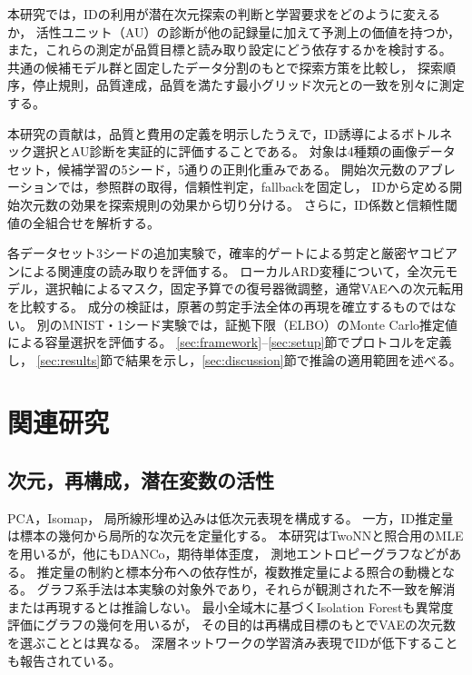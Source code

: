 \documentclass[11pt,a4paper]{ltjsarticle}
\begin{document}
本研究では，IDの利用が潜在次元探索の判断と学習要求をどのように変えるか，
活性ユニット（AU）の診断が他の記録量に加えて予測上の価値を持つか，
また，これらの測定が品質目標と読み取り設定にどう依存するかを検討する。
共通の候補モデル群と固定したデータ分割のもとで探索方策を比較し，
探索順序，停止規則，品質達成，品質を満たす最小グリッド次元との一致を別々に測定する。

本研究の貢献は，品質と費用の定義を明示したうえで，ID誘導によるボトルネック選択とAU診断を実証的に評価することである。
対象は4種類の画像データセット，候補学習の5シード，5通りの正則化重みである。
開始次元数のアブレーションでは，参照群の取得，信頼性判定，fallbackを固定し，
IDから定める開始次元数の効果を探索規則の効果から切り分ける。
さらに，ID係数と信頼性閾値の全組合せを解析する。

各データセット3シードの追加実験で，確率的ゲートによる剪定と厳密ヤコビアンによる関連度の読み取りを評価する。
ローカルARD変種について，全次元モデル，選択軸によるマスク，固定予算での復号器微調整，通常VAEへの次元転用を比較する。
成分の検証は，原著の剪定手法全体の再現を確立するものではない。
別のMNIST・1シード実験では，証拠下限（ELBO）のMonte Carlo推定値による容量選択を評価する。
\ref{sec:framework}--\ref{sec:setup}節でプロトコルを定義し，
\ref{sec:results}節で結果を示し，\ref{sec:discussion}節で推論の適用範囲を述べる。

\section{関連研究}\label{sec:related}

\subsection{次元，再構成，潜在変数の活性}
PCA\cite{tippingbishop1999ppca}，Isomap\cite{tenenbaum2000isomap}，
局所線形埋め込み\cite{roweis2000lle}は低次元表現を構成する。
一方，ID推定量は標本の幾何から局所的な次元を定量化する。
本研究はTwoNNと照合用のMLEを用いるが，他にもDANCo，期待単体歪度，
測地エントロピーグラフなどがある\cite{ceruti2014danco,johnsson2015ess,costa2004geodesic}。
推定量の制約と標本分布への依存性が，複数推定量による照合の動機となる\cite{camastra2016intrinsic,allegra2020data}。
グラフ系手法は本実験の対象外であり，それらが観測された不一致を解消または再現するとは推論しない。
最小全域木に基づくIsolation Forestも異常度評価にグラフの幾何を用いる\cite{galka2022isolation}が，
その目的は再構成目標のもとでVAEの次元数を選ぶこととは異なる。
深層ネットワークの学習済み表現でIDが低下することも報告されている\cite{ansuini2019intrinsic,pope2021intrinsic}。
\end{document}
